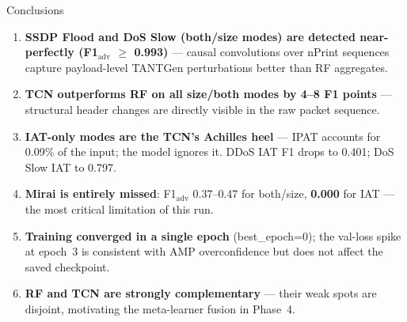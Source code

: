 \documentclass[10pt,aspectratio=169]{beamer}
\newcommand{\good}[1]{\textcolor{good}{\textbf{#1}}}
\newcommand{\warn}[1]{\textcolor{warn}{\textbf{#1}}}
\newcommand{\bad}[1]{\textcolor{bad}{\textbf{#1}}}
\begin{document}
\begin{frame}{Conclusions}
\begin{enumerate}
  \item \good{SSDP Flood and DoS Slow (both/size modes) are detected
        near-perfectly (F1$_\text{adv}$ $\geq$ 0.993)} --- causal
        convolutions over nPrint sequences capture payload-level TANTGen
        perturbations better than RF aggregates.
  \item \good{TCN outperforms RF on all size/both modes by 4--8 F1
        points} --- structural header changes are directly visible in the
        raw packet sequence.
  \item \warn{IAT-only modes are the TCN's Achilles heel} --- IPAT
        accounts for 0.09\% of the input; the model ignores it.
        DDoS IAT F1 drops to 0.401; DoS Slow IAT to 0.797.
  \item \bad{Mirai is entirely missed}: F1$_\text{adv}$ 0.37--0.47
        for both/size, \bad{0.000} for IAT --- the most critical
        limitation of this run.
  \item \warn{Training converged in a single epoch} (best\_epoch=0);
        the val-loss spike at epoch~3 is consistent with AMP
        overconfidence but does not affect the saved checkpoint.
  \item \good{RF and TCN are strongly complementary} --- their
        weak spots are disjoint, motivating the meta-learner fusion
        in Phase~4.
\end{enumerate}
\end{frame}
\end{document}
